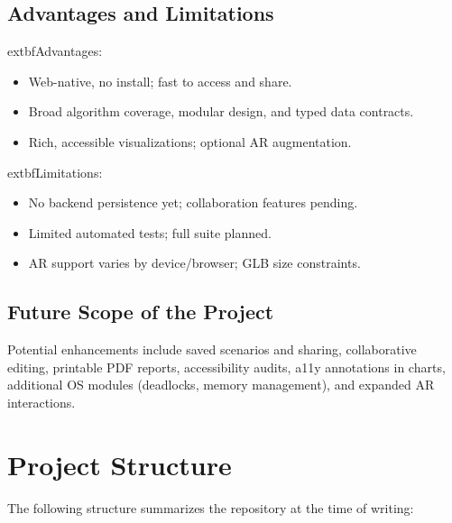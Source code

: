 \documentclass[12pt,a4paper,oneside]{report}
\begin{document}
\section{Advantages and Limitations}
	extbf{Advantages:}
\begin{itemize}
  \item Web-native, no install; fast to access and share.
  \item Broad algorithm coverage, modular design, and typed data contracts.
  \item Rich, accessible visualizations; optional AR augmentation.
\end{itemize}

	extbf{Limitations:}
\begin{itemize}
  \item No backend persistence yet; collaboration features pending.
  \item Limited automated tests; full suite planned.
  \item AR support varies by device/browser; GLB size constraints.
\end{itemize}

\section{Future Scope of the Project}
Potential enhancements include saved scenarios and sharing, collaborative editing, printable PDF reports, accessibility audits, a11y annotations in charts, additional OS modules (deadlocks, memory management), and expanded AR interactions.

\appendix
\chapter{Project Structure}
The following structure summarizes the repository at the time of writing:
\end{document}
